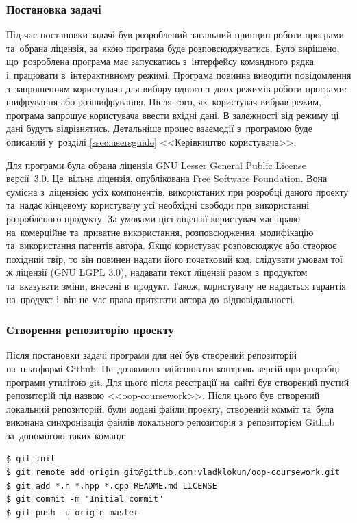 \documentclass[a4paper,oneside,titlepage,14pt]{extarticle}
\begin{document}
			\subsubsection{Постановка задачі}
				Під час постановки задачі був розроблений загальний принцип роботи програми та~обрана ліцензія, за~якою програма буде розповсюджуватись. Було вирішено, що~розроблена програма має запускатись з~інтерфейсу командного рядка і~працювати в~інтерактивному режимі. Програма повинна виводити повідомлення з~запрошенням користувача для вибору одного з~двох режимів роботи програми: шифрування або розшифрування. Після того, як~користувач вибрав режим, програма запрошує користувача ввести вхідні дані. В залежності від режиму ці дані будуть відрізнятись. Детальніше процес взаємодії з~програмою буде описаний у~розділі \ref{ssec:usersguide} <<Керівництво користувача>>.\par
				Для програми була обрана ліцензія GNU Lesser General Public License версії~3.0. Це~вільна ліцензія, опублікована Free Software Foundation. Вона сумісна з~ліцензією усіх компонентів, використаних при розробці даного проекту та~надає кінцевому користувачу усі необхідні свободи при використанні розробленого продукту. За умовами цієї ліцензії користувач має право на~комерційне та~приватне використання, розповсюдження, модифікацію та~використання патентів автора. Якщо користувач розповсюджує або створює похідний твір, то він повинен надати його початковий код, слідувати умовам тої ж ліцензії (GNU LGPL 3.0), надавати текст ліцензії разом з~продуктом та~вказувати зміни, внесені в~продукт. Також, користувачу не надається гарантія на~продукт і~він не має права притягати автора до~відповідальності.\par
			\subsubsection{Створення репозиторію проекту}
				Після постановки задачі програми для неї був створений репозиторій на~платформі Github. Це~дозволило здійснювати контроль версій при розробці програми утилітою git. Для цього після реєстрації на~сайті був створений пустий репозиторій під назвою <<oop-coursework>>. Після цього був створений локальний репозиторій, були додані файли проекту, створений комміт та~була виконана синхронізація файлів локального репозиторія з~репозиторієм Github за~допомогою таких команд:
			\begin{verbatim}
$ git init
$ git remote add origin git@github.com:vladklokun/oop-coursework.git
$ git add *.h *.hpp *.cpp README.md LICENSE
$ git commit -m "Initial commit"
$ git push -u origin master
			\end{verbatim}
			\par
\end{document}

